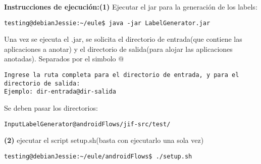  \textbf{Instrucciones de
ejecución:}\newline \textbf{(1)} Ejecutar el jar para la generación de los labels:
\begin{lstlisting}
testing@debianJessie:~/eule$ java -jar LabelGenerator.jar
\end{lstlisting}
Una vez se ejecuta el .jar, se solicita el directorio de entrada(que contiene
las aplicaciones a anotar) y el directorio de salida(para alojar las
aplicaciones anotadas). Separados por el simbolo @
\begin{lstlisting}
Ingrese la ruta completa para el directorio de entrada, y para el 
directorio de salida:
Ejemplo: dir-entrada@dir-salida 
\end{lstlisting}
Se deben pasar los directorios:
\begin{lstlisting}
InputLabelGenerator@androidFlows/jif-src/test/
\end{lstlisting}

\textbf{(2)} ejecutar el script setup.sh(basta con ejecutarlo una sola vez)
\begin{lstlisting}
testing@debianJessie:~/eule/androidFlows$ ./setup.sh
\end{lstlisting}

